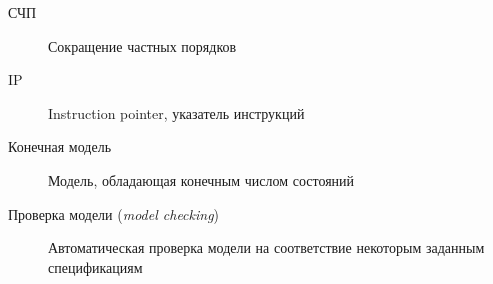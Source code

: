 \Abbreviations
\begin{description}
\item[СЧП] Сокращение частных порядков
\item[IP] Instruction pointer, указатель инструкций
\end{description}

\Defines
\begin{description}
\item[Конечная модель] Модель, обладающая конечным числом состояний
\item[Проверка модели (\textit{model checking})] Автоматическая проверка модели на
  соответствие некоторым заданным спецификациям
\end{description}


